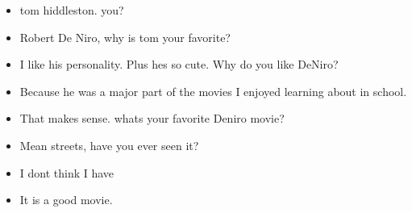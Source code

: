 \documentclass[11pt,a4paper]{article}
\begin{document}
\begin{itemize}
\item[\ding{172}] tom hiddleston. you?
\item[\ding{173}] Robert De Niro, why is tom your favorite?
\item[\ding{172}] I like his personality. Plus hes so cute. Why do you like DeNiro?
\item[\ding{173}] Because he was a major part of the movies I enjoyed learning about in school.
\item[\ding{172}] That makes sense. whats your favorite Deniro movie? 
\item[\ding{173}] Mean streets, have you ever seen it?
\item[\ding{172}] I dont think I have 
\item[\ding{173}] It is a good movie.
\end{itemize}
\end{document}
